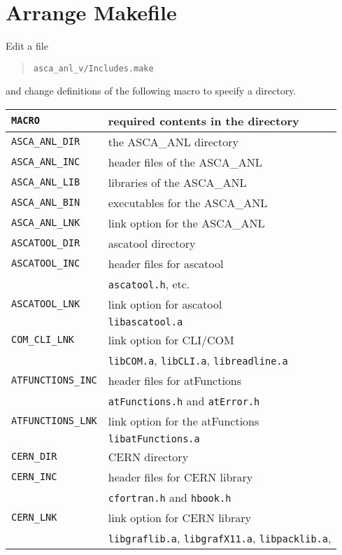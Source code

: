 \section{Arrange Makefile}
Edit a file
\begin{quote}
   {\tt asca\_anl\_v\ANLversion/Includes.make}
\end{quote}
and change definitions of the following macro to specify a directory.\\
\begin{table}[htb]
\begin{center}
\begin{tabular}{ll}
\hline
   {\tt MACRO} & required contents in the directory\\
\hline
   {\tt ASCA\_ANL\_DIR}	& the ASCA\_ANL directory \\
   {\tt ASCA\_ANL\_INC}	& header files of the ASCA\_ANL \\
   {\tt ASCA\_ANL\_LIB}	& libraries of the ASCA\_ANL \\
   {\tt ASCA\_ANL\_BIN}	& executables for the ASCA\_ANL \\
   {\tt ASCA\_ANL\_LNK} & link option for the ASCA\_ANL \\
   {\tt ASCATOOL\_DIR}	& ascatool directory \\
   {\tt ASCATOOL\_INC}	& header files for ascatool \\
	& {\tt ascatool.h}, etc. \\
   {\tt ASCATOOL\_LNK}  & link option for ascatool\\
	& {\tt libascatool.a} \\
   {\tt COM\_CLI\_LNK}  & link option for CLI/COM \\
	& {\tt libCOM.a}, {\tt libCLI.a}, {\tt libreadline.a} \\
   {\tt ATFUNCTIONS\_INC}& header files for atFunctions \\
	& {\tt atFunctions.h} and {\tt atError.h} \\
   {\tt ATFUNCTIONS\_LNK} & link option for the atFunctions \\
	& {\tt libatFunctions.a} \\
   {\tt CERN\_DIR}	& CERN directory \\
   {\tt CERN\_INC}	& header files for CERN library \\
	& {\tt cfortran.h} and {\tt hbook.h} \\
   {\tt CERN\_LNK}      & link option for CERN library \\
	& {\tt libgraflib.a}, {\tt libgrafX11.a}, {\tt libpacklib.a}, \\

\end{tabular}
\end{center}
\end{table}
